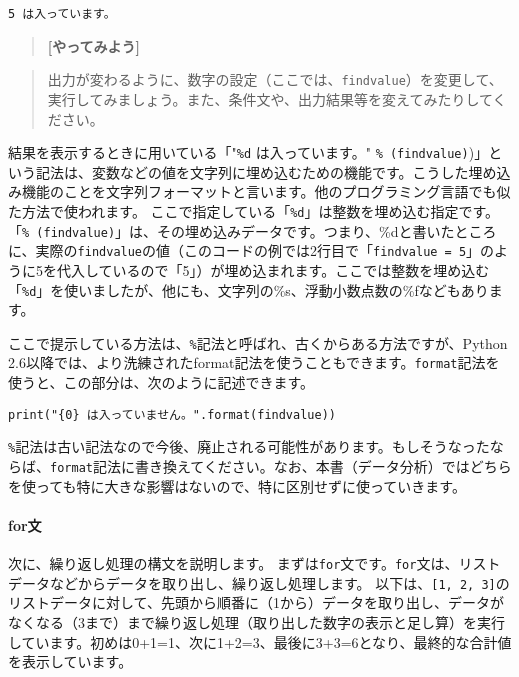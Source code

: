 \documentclass[11pt]{article}
\begin{document}
    \begin{Verbatim}[commandchars=\\\{\}]
5 は入っています。

    \end{Verbatim}

    \begin{quote}
\textbf{{[}やってみよう{]}}
\end{quote}

\begin{quote}
出力が変わるように、数字の設定（ここでは、\texttt{findvalue}）を変更して、実行してみましょう。また、条件文や、出力結果等を変えてみたりしてください。
\end{quote}

    結果を表示するときに用いている「"\texttt{\%d} は入っています。"
\texttt{\%\ (findvalue)})」という記法は、変数などの値を文字列に埋め込むための機能です。こうした埋め込み機能のことを文字列フォーマットと言います。他のプログラミング言語でも似た方法で使われます。
ここで指定している「\texttt{\%d}」は整数を埋め込む指定です。「\texttt{\%\ (findvalue)}」は、その埋め込みデータです。つまり、\%dと書いたところに、実際の\texttt{findvalue}の値（このコードの例では2行目で「\texttt{findvalue\ =\ 5}」のように5を代入しているので「5」）が埋め込まれます。ここでは整数を埋め込む「\texttt{\%d}」を使いましたが、他にも、文字列の\%s、浮動小数点数の\%fなどもあります。

ここで提示している方法は、\texttt{\%}記法と呼ばれ、古くからある方法ですが、Python
2.6以降では、より洗練されたformat記法を使うこともできます。\texttt{format}記法を使うと、この部分は、次のように記述できます。

\texttt{print("\{0\}\ は入っていません。".format(findvalue))}

\texttt{\%}記法は古い記法なので今後、廃止される可能性があります。もしそうなったならば、\texttt{format}記法に書き換えてください。なお、本書（データ分析）ではどちらを使っても特に大きな影響はないので、特に区別せずに使っていきます。

    \paragraph{for文}\label{forux6587}

次に、繰り返し処理の構文を説明します。
まずは\texttt{for}文です。\texttt{for}文は、リストデータなどからデータを取り出し、繰り返し処理します。
以下は、\texttt{{[}1,\ 2,\ 3{]}}のリストデータに対して、先頭から順番に（1から）データを取り出し、データがなくなる（3まで）まで繰り返し処理（取り出した数字の表示と足し算）を実行しています。初めは0+1=1、次に1+2=3、最後に3+3=6となり、最終的な合計値を表示しています。
\end{document}
